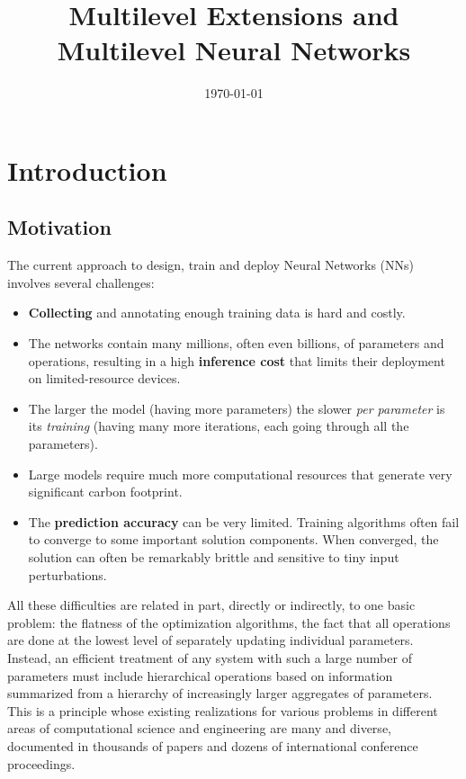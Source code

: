 \documentclass{article} %
\title{Multilevel Extensions and Multilevel Neural Networks}
\date{\today}
\begin{document}
\maketitle



\section{Introduction}
\subsection{Motivation}
The current approach to design, train and deploy Neural Networks (NNs) involves several challenges:

\begin{itemize}
    \item \textbf{Collecting} and annotating enough training data is hard and costly.
    \item The networks contain many millions, often even billions, of parameters and operations, resulting in a high \textbf{inference cost} that limits their deployment on limited-resource devices.
    \item The larger the model (having more parameters) the slower {\it per parameter} is its {\it training} (having many more iterations, each going through all the parameters).
    \item Large models require much more computational resources that generate very significant carbon footprint.
    \item The \textbf{prediction accuracy} can be very limited. Training algorithms often fail to converge to some important solution components. When converged, the solution can often be remarkably brittle and sensitive to tiny input perturbations.
 \end{itemize}
 
All these difficulties are related in part, directly or indirectly, to one basic problem: the flatness of the optimization algorithms, the fact that all operations are done at the lowest level of separately updating individual parameters. Instead, an efficient treatment of any system with such a large number of parameters must include hierarchical operations based on information summarized from a hierarchy of increasingly larger aggregates of parameters. This is a principle whose existing realizations for various problems in different areas of computational science and engineering are many and diverse, documented in thousands of papers and dozens of international conference proceedings. 
\end{document}

